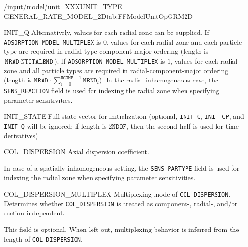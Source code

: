 \begin{condsubgroup}{/input/model/unit\_XXX}{UNIT\_TYPE = GENERAL\_RATE\_MODEL\_2D}{tab:FFModelUnitOpGRM2D}
\begin{dataset}[unit=\si{\mol\per\cubic\metre\of{SP}},type=double,range={$\geq 0$}]{INIT\_Q}
    Alternatively, values for each radial zone can be supplied.
    If \texttt{ADSORPTION\_MODEL\_MULTIPLEX} is $0$, values for each radial zone and each particle type are required in radial-type-component-major ordering (length is $\texttt{NRAD} \cdot \texttt{NTOTALBND}$).
    If \texttt{ADSORPTION\_MODEL\_MULTIPLEX} is $1$, values for each radial zone and all particle types are required in radial-component-major ordering (length is $\texttt{NRAD} \cdot \sum_{i = 0}^{\texttt{NCOMP} - 1} \texttt{NBND}_i$).
    In the radial-inhomogeneous case, the \texttt{SENS\_REACTION} field is used for indexing the radial zone when specifying parameter sensitivities.
  \end{dataset}
  \begin{dataset}[unit=various,type=double,range={$\mathds{R}$},length={\texttt{NDOF} / $2\texttt{NDOF}$}]{INIT\_STATE}
    Full state vector for initialization (optional, \texttt{INIT\_C}, \texttt{INIT\_CP}, and \texttt{INIT\_Q} will be ignored; if length is $2\texttt{NDOF}$, then the second half is used for time derivatives)
  \end{dataset}
  \begin{dataset}[unit=\si{\square\metre\of{IV}\per\second},type=double,range={$\geq 0$},length={see \texttt{COL\_DISPERSION\_MULTIPLEX}}]{COL\_DISPERSION}
    Axial dispersion coefficient.

    In case of a spatially inhomogeneous setting, the \texttt{SENS\_PARTYPE} field is used for indexing the radial zone when specifying parameter sensitivities.
  \end{dataset}
  \begin{dataset}[unit=--,type=int,range={$\{0, \dots, 7 \}$},length={1}]{COL\_DISPERSION\_MULTIPLEX}
    Multiplexing mode of \texttt{COL\_DISPERSION}.
    Determines whether \texttt{COL\_DISPERSION} is treated as component-, radial-, and/or section-independent.

    This field is optional.
    When left out, multiplexing behavior is inferred from the length of \texttt{COL\_DISPERSION}.


\end{dataset}
\end{condsubgroup}
